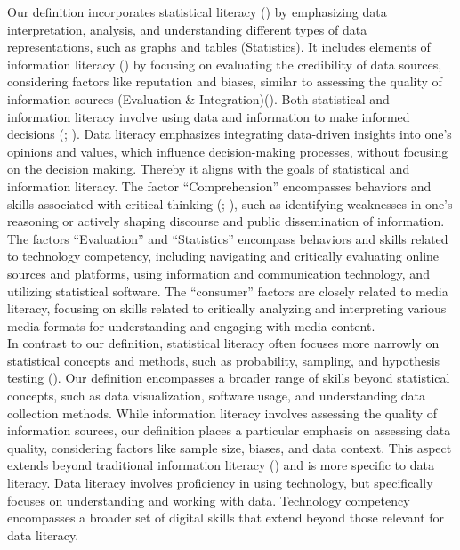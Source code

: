 \documentclass[
  12pt,
  a4paper,
  twoside]{article}
\begin{document}
Our definition incorporates statistical literacy () by emphasizing data interpretation, analysis, and understanding different types of data representations, such as graphs and tables (Statistics). It includes elements of information literacy () by focusing on evaluating the credibility of data sources, considering factors like reputation and biases, similar to assessing the quality of information sources (Evaluation \& Integration)(). Both statistical and information literacy involve using data and information to make informed decisions (; ). Data literacy emphasizes integrating data-driven insights into one's opinions and values, which influence decision-making processes, without focusing on the decision making. Thereby it aligns with the goals of statistical and information literacy. The factor ``Comprehension'' encompasses behaviors and skills associated with critical thinking (; ), such as identifying weaknesses in one's reasoning or actively shaping discourse and public dissemination of information. The factors ``Evaluation'' and ``Statistics'' encompass behaviors and skills related to technology competency, including navigating and critically evaluating online sources and platforms, using information and communication technology, and utilizing statistical software. The ``consumer'' factors are closely related to media literacy, focusing on skills related to critically analyzing and interpreting various media formats for understanding and engaging with media content.\\
In contrast to our definition, statistical literacy often focuses more narrowly on statistical concepts and methods, such as probability, sampling, and hypothesis testing (). Our definition encompasses a broader range of skills beyond statistical concepts, such as data visualization, software usage, and understanding data collection methods. While information literacy involves assessing the quality of information sources, our definition places a particular emphasis on assessing data quality, considering factors like sample size, biases, and data context. This aspect extends beyond traditional information literacy () and is more specific to data literacy. Data literacy involves proficiency in using technology, but specifically focuses on understanding and working with data. Technology competency encompasses a broader set of digital skills that extend beyond those relevant for data literacy.
\end{document}
